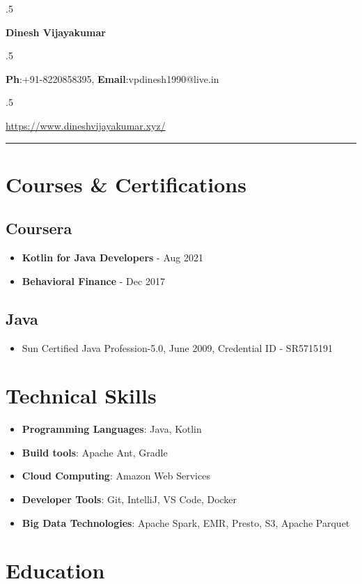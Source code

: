 \documentclass[10pt]{article}
\begin{document}
\moveleft.5\hoffset\centerline{\huge\bf Dinesh Vijayakumar} %
\moveleft.5\hoffset\centerline{{\bf Ph}:+91-8220858395, {\bf Email}:vpdinesh1990@live.in}
\moveleft.5\hoffset\centerline{\href{https://www.dineshvijayakumar.xyz/}{https://www.dineshvijayakumar.xyz/}}
\hrule

\begin{minipage}[t]{0.40\textwidth}
\vspace{10pt}

\section*{Courses \& Certifications}
\subsection*{Coursera}
\begin{itemize}
\item {\bf Kotlin for Java Developers} - Aug 2021
\item {\bf Behavioral Finance} - Dec 2017
\end{itemize}
\subsection*{Java}
\begin{itemize}
\item Sun Certified Java Profession-5.0, June 2009, Credential ID - SR5715191
\end{itemize}

\section*{Technical Skills}
\begin{itemize}
\item {\bf Programming Languages}: Java, Kotlin
\item {\bf Build tools}: Apache Ant, Gradle
\item {\bf Cloud Computing}: Amazon Web Services
\item {\bf Developer Tools}: Git, IntelliJ, VS Code, Docker
\item {\bf Big Data Technologies}: Apache Spark, EMR, Presto, S3, Apache Parquet
\end{itemize}
\section*{Education}



\end{minipage}
\end{document}
